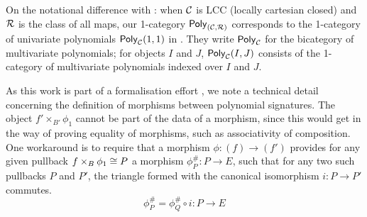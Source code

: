 On the notational difference with \cite{gambino2013}:
when $\mathcal{C}$ is LCC (locally cartesian closed) and $\mathcal{R}$ is the class of all maps,
our 1-category $\mathsf{Poly}_{(\mathcal{C},\mathcal{R})}$ corresponds to the 1-category
of univariate polynomials $\mathsf{Poly}_{\mathcal{C}} (1,1)$ in \cite{gambino2013}.
They write $\mathsf{Poly}_{\mathcal{C}}$ for the bicategory of multivariate polynomials;
for objects $I$ and $J$,
$\mathsf{Poly}_{\mathcal{C}}(I,J)$ consists of the 1-category of multivariate polynomials
indexed over $I$ and $J$.

\begin{remark}
  As this work is part of a formalisation effort
  \cite{hazratpour2024poly},
  we note a technical detail concerning the definition of morphisms
  between polynomial signatures.
  The object $f' \times_{B'} \phi_1$
  cannot be part of the data of a morphism,
  since this would get in the way of proving equality of morphisms,
  such as associativity of composition.
  One workaround is to require that a morphism $\phi : (f) \to (f')$
  provides {for any given pullback} $f \times_B \phi_1 \cong P$ a morphism
  $\phi^\#_P : P \to E$,
  such that for any two such pullbacks $P$ and $P'$,
  the triangle formed with the canonical isomorphism $i : P \to P'$ commutes.
  \[\phi^\#_P = \phi^\#_Q \circ i : P \to E\]
\end{remark}

